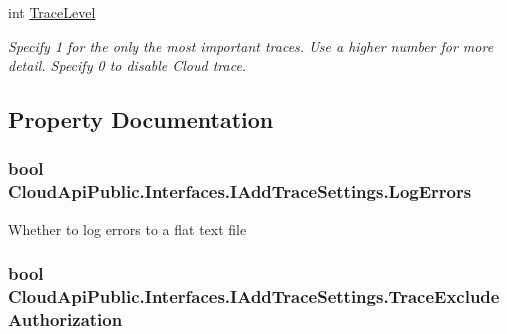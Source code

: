 \begin{DoxyCompactItemize}
int \hyperlink{interface_cloud_api_public_1_1_interfaces_1_1_i_add_trace_settings_aafa54c3e44b46a667daf7219dcbce0ce}{Trace\-Level}
\begin{DoxyCompactList}\small\item\em Specify 1 for the only the most important traces. Use a higher number for more detail. Specify 0 to disable Cloud trace. \end{DoxyCompactList}\end{DoxyCompactItemize}


\subsection{Property Documentation}
\hypertarget{interface_cloud_api_public_1_1_interfaces_1_1_i_add_trace_settings_a408aee5af8022c8d372501af301459a6}{
\subsubsection[{Log\-Errors}]{\setlength{\rightskip}{0pt plus 5cm}bool Cloud\-Api\-Public.\-Interfaces.\-I\-Add\-Trace\-Settings.\-Log\-Errors\hspace{0.3cm}{\ttfamily [get]}}}\label{interface_cloud_api_public_1_1_interfaces_1_1_i_add_trace_settings_a408aee5af8022c8d372501af301459a6}


Whether to log errors to a flat text file 

\hypertarget{interface_cloud_api_public_1_1_interfaces_1_1_i_add_trace_settings_a29cd00532a90fca920517cfb163b0a42}{
\subsubsection[{Trace\-Exclude\-Authorization}]{\setlength{\rightskip}{0pt plus 5cm}bool Cloud\-Api\-Public.\-Interfaces.\-I\-Add\-Trace\-Settings.\-Trace\-Exclude\-Authorization\hspace{0.3cm}{\ttfamily [get]}}}\label{interface_cloud_api_public_1_1_interfaces_1_1_i_add_trace_settings_a29cd00532a90fca920517cfb163b0a42}


